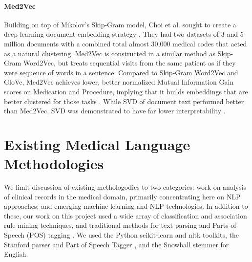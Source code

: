 \paragraph{Med2Vec} \label{sec:med2vec} Building on top of Mikolov's Skip-Gram model, Choi et al. sought to create a deep learning document embedding strategy \cite{med2vec}. They had two datasets of 3 and 5 million documents with a combined total almost 30,000 medical codes that acted as a natural clustering. \textsf{Med2Vec} is constructed in a similar method as \textsf{Skip-Gram Word2Vec}, but treats sequential visits from the same patient as if they were sequence of words in a sentence. Compared to \textsf{Skip-Gram Word2Vec} and \textsf{GloVe}, \textsf{Med2Vec} achieves lower, better normalized Mutual Information Gain scores on Medication and Procedure, implying that it builds embeddings that are better clustered for those tasks \cite{GloVe}. While \textsf{SVD} of document text performed better than \textsf{Med2Vec}, \textsf{SVD} was demonstrated to have far lower interpretability \cite{svd}. 

\section{Existing Medical Language Methodologies}

We limit discussion of existing methologodies to two categories:
work on analysis of clinical records in the medical domain, primarily concentrating
here on NLP approaches; and emerging machine learning and NLP technologies.
In addition to these, our work on this project used a wide array of 
classification \cite{wu08} and association rule mining \cite{fpgrowth} techniques, and
traditional methods for text parsing and Parts-of-Speech (POS) tagging \cite{stanfordparser}. 
We used the Python \textsf{scikit-learn} \cite{scikit-learn} 
and \textsf{nltk} \cite{nltk} toolkits, the Stanford parser and Part of Speech Tagger \cite{stanfordparser}, and 
the Snowball stemmer for English\cite{snowball}. 

